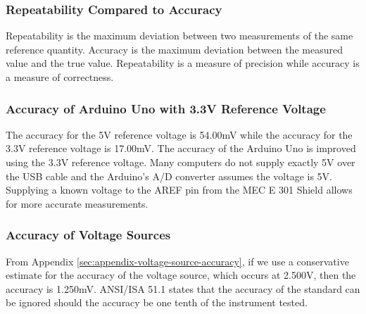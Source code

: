 \subsubsection{Repeatability Compared to Accuracy}
Repeatability is the maximum deviation between two measurements of the same reference quantity. Accuracy is the maximum deviation between the
measured value and the true value. Repeatability is a measure of precision while accuracy is a measure of correctness.

\subsubsection{Accuracy of Arduino Uno with 3.3V Reference Voltage}


The accuracy for the 5V reference voltage is 54.00mV while the accuracy for the 3.3V reference voltage is 17.00mV. The accuracy of the Arduino Uno is improved
using the 3.3V reference voltage. Many computers do not supply exactly 5V over the USB cable and the Arduino's A/D converter assumes the voltage is 5V. 
Supplying a known voltage to the AREF pin from the MEC E 301 Shield allows for more accurate measurements.

\subsubsection{Accuracy of Voltage Sources}
From Appendix \ref{sec:appendix-voltage-source-accuracy}, if we use a conservative estimate for the accuracy of the voltage source, which occurs at 2.500V, then the accuracy is 1.250mV. ANSI/ISA 51.1 states that the accuracy of the standard
can be ignored should the accuracy be one tenth of the instrument tested. %

